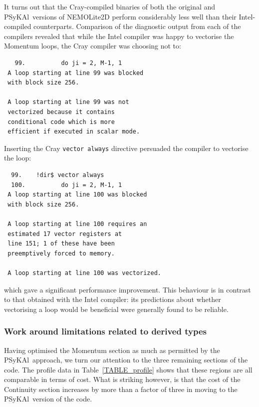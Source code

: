\documentclass[journal]{IEEEtran}
\newcommand{\psykal}{{PS}y{KA}l}
\begin{document}
It turns out that the Cray-compiled binaries of both the original and
\psykal\ versions of NEMOLite2D perform considerably less well than
their Intel-compiled counterparts. Comparison of the diagnostic output
from each of the compilers revealed that while the Intel compiler was
happy to vectorise the Momentum loops, the Cray compiler was choosing
not to:
\begin{verbatim}
   99.          do ji = 2, M-1, 1
 A loop starting at line 99 was blocked 
 with block size 256.

 A loop starting at line 99 was not
 vectorized because it contains 
 conditional code which is more
 efficient if executed in scalar mode.
\end{verbatim}
Inserting the Cray {\tt vector always} directive persuaded the compiler
to vectorise the loop:
\begin{verbatim}
  99.    !dir$ vector always
  100.          do ji = 2, M-1, 1
 A loop starting at line 100 was blocked
 with block size 256.

 A loop starting at line 100 requires an 
 estimated 17 vector registers at 
 line 151; 1 of these have been 
 preemptively forced to memory.

 A loop starting at line 100 was vectorized.
\end{verbatim}
which gave a significant performance improvement. This behaviour is in
contrast to that obtained with the Intel compiler: its predictions
about whether vectorising a loop would be beneficial were generally
found to be reliable.

\subsubsection{Work around limitations related to derived types}

Having optimised the Momentum section as much as permitted by the
\psykal\ approach, we turn our attention to the three remaining
sections of the code. The profile data in Table~\ref{TABLE_profile}
shows that these regions are all comparable in terms of cost. What is
striking however, is that the cost of the Continuity section increases
by more than a factor of three in moving to the \psykal\ version of the
code.
\end{document}
